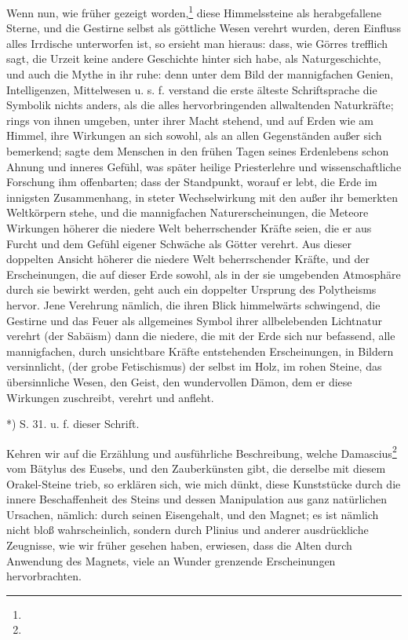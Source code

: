 \documentclass[a4paper, 11pt, oneside, polutonikogreek, german]{article}
\begin{document}
Wenn nun, wie früher gezeigt worden,\footnote{} diese Himmelssteine als herabgefallene Sterne, und die Gestirne selbst als göttliche Wesen verehrt wurden, deren Einfluss alles Irrdische unterworfen ist, so ersieht man hieraus: dass, wie Görres trefflich sagt, die Urzeit keine andere Geschichte hinter sich habe, als Naturgeschichte, und auch die Mythe in ihr ruhe: denn unter dem Bild der mannigfachen Genien, Intelligenzen, Mittelwesen u. s. f. verstand die erste älteste Schriftsprache die Symbolik nichts anders, als die alles hervorbringenden allwaltenden Naturkräfte; rings von ihnen umgeben, unter ihrer Macht stehend, und auf Erden wie am Himmel, ihre Wirkungen an sich sowohl, als an allen Gegenständen außer sich bemerkend; sagte dem Menschen in den frühen Tagen seines Erdenlebens schon Ahnung und inneres Gefühl, was später heilige Priesterlehre und wissenschaftliche Forschung ihm offenbarten; dass der Standpunkt, worauf er lebt, die Erde im innigsten Zusammenhang, in steter Wechselwirkung mit den außer ihr bemerkten Weltkörpern stehe, und die mannigfachen Naturerscheinungen, die Meteore Wirkungen höherer die niedere Welt beherrschender Kräfte seien, die er aus Furcht und dem Gefühl eigener Schwäche als Götter verehrt. Aus dieser doppelten Ansicht höherer die niedere Welt beherrschender Kräfte, und der Erscheinungen, die auf dieser Erde sowohl, als in der sie umgebenden Atmosphäre durch sie bewirkt werden, geht auch ein doppelter Ursprung des Polytheisms hervor. Jene Verehrung nämlich, die ihren Blick himmelwärts schwingend, die Gestirne und das Feuer als allgemeines Symbol ihrer allbelebenden Lichtnatur verehrt (der Sabäism) dann die niedere, die mit der Erde sich nur befassend, alle mannigfachen, durch unsichtbare Kräfte entstehenden Erscheinungen, in Bildern versinnlicht, (der grobe Fetischismus) der selbst im Holz, im rohen Steine, das übersinnliche Wesen, den Geist, den wundervollen Dämon, dem er diese Wirkungen zuschreibt, verehrt und anfleht.

*) S. 31. u. f. dieser Schrift.

Kehren wir auf die Erzählung und ausführliche Beschreibung, welche Damascius\footnote{} vom Bätylus des Eusebs, und den Zauberkünsten gibt, die derselbe mit diesem Orakel-Steine trieb, so erklären sich, wie mich dünkt, diese Kunststücke durch die innere Beschaffenheit des Steins und dessen Manipulation aus ganz natürlichen Ursachen, nämlich: durch seinen Eisengehalt, und den Magnet; es ist nämlich nicht bloß wahrscheinlich, sondern durch Plinius und anderer ausdrückliche Zeugnisse, wie wir früher gesehen haben, erwiesen, dass die Alten durch Anwendung des Magnets, viele an Wunder grenzende Erscheinungen hervorbrachten.
\end{document}
